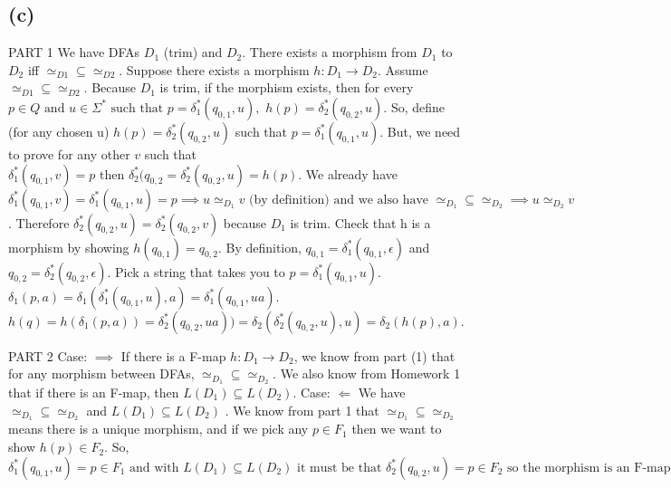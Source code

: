 \documentclass[12pt]{article}
\begin{document}
\subsection*{(c)}
PART 1\newline
We have DFAs $D_1$ (trim) and $D_2$. There exists a morphism from $D_1$ to $D_2$
iff $\simeq_{D1} \subseteq \simeq_{D2}$. Suppose there exists a morphism $h:D_1 \rightarrow D_2$. Assume $\simeq_{D1} \subseteq \simeq_{D2}$. Because $D_1$ is
trim, if the morphism exists, then for every $p \in Q \text{ and } u
 \in \Sigma^{*} \text{ such that } p = \delta_1^{*}(q_{0,1}, u),$ $ 
h(p) = \delta^{*}_2(q_{0,2}, u)$.\newline
So, define (for any chosen u) $h(p) = \delta^{*}_2(q_{0,2}, u)$ such
 that $p = \delta^{*}_1(q_{0,1}, u)$.
But, we need to prove for any other $v$ such that $\delta^{*}_1(q_{0,1}, v) = p 
\text{ then } \delta^{*}_2 (q_{0,2} = \delta^{*}_2(q_{0,2}, u) = h(p)$.
We already have $\delta^{*}_1(q_{0,1} , v) = \delta^{*}_1(q_{0,1}, u) = p
\implies u \simeq_{D_1} v \text{ (by definition) and we also have } 
\simeq_{D_1} \subseteq \simeq_{D_2} \implies  u \simeq_{D_2} v$.
Therefore $\delta^{*}_2(q_{0,2} , u) = \delta^{*}_2(q_{0,2}, v)$ because $D_1$ is trim. \newline
Check that h is a morphism by showing $h(q_{0,1})=q_{0,2}$. By definition,
$q_{0,1}=\delta^{*}_1(q_{0,1} , \epsilon )$ and 
$q_{0,2}=\delta^{*}_2(q_{0,2} , \epsilon )$.
Pick a string that takes you to $p=\delta^{*}_1(q_{0,1}, u)$. \newline
$\delta_1(p,a) = \delta_1(\delta^{*}_1(q_{0,1} , u), a) =
\delta^{*}_1(q_{0,1}, ua)$. \newline
$h(q)=h(\delta_1(p,a))=\delta^{*}_2(q_{0,2}, ua) )=
\delta_2(\delta^{*}_2(q_{0,2}, u), u)
= \delta_2(h(p),a)$. 

\medskip

PART 2\newline
Case: $\implies$ \newline
If there is a F-map $h: D_1 \rightarrow D_2$, we know from part (1) that 
for any morphism between DFAs, $\simeq_{D_1} \subseteq \simeq_{D_2}$.  
We also know from Homework 1 that if there is an F-map, then $L(D_1) \subseteq L(D_2)$. \newline
Case: $\Longleftarrow$ \newline
We have $\simeq_{D_1} \subseteq \simeq_{D_2}$ and $L(D_1) \subseteq 
L(D_2)$ . We know from part 1 that $\simeq_{D_1} \subseteq \simeq_{D_2}$
 means there is a unique morphism, and if we pick any $p \in F_1$ then
we want to show $h(p) \in F_2$. 
So, $\delta^{*}_1(q_{0,1}, u) = p \in F_1 \text{ and with } L(D_1) \subseteq 
L(D_2) \text{ it must be that } \delta^{*}_2(q_{0,2}, u) = p \in F_2 
\text{ so the morphism is an F-map. }$
\end{document}
